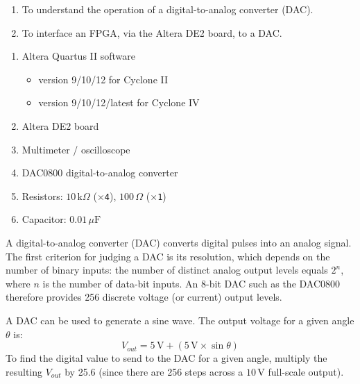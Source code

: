 
\begin{objectives}
  \begin{enumerate}
    \item To understand the operation of a digital-to-analog converter (DAC).
    \item To interface an FPGA, via the Altera DE2 board, to a DAC.
  \end{enumerate}
\end{objectives}

\begin{equipment}
  \begin{enumerate}
    \item Altera Quartus II software
          \begin{itemize}
            \item version 9/10/12 for Cyclone II
            \item version 9/10/12/latest for Cyclone IV
          \end{itemize}
    \item Altera DE2 board
    \item Multimeter / oscilloscope
    \item DAC0800 digital-to-analog converter
    \item Resistors: $10\,\text{k}\Omega$ (\texttt{$\times$4}), $100\,\Omega$ (\texttt{$\times$1})
    \item Capacitor: $0.01\,\mu\text{F}$
  \end{enumerate}
\end{equipment}

\begin{introduction}
  A digital-to-analog converter (DAC) converts digital pulses into an analog signal. The first criterion for judging a DAC is its resolution, which depends on the number of binary inputs: the number of distinct analog output levels equals $2^n$, where $n$ is the number of data-bit inputs. An 8-bit DAC such as the DAC0800 therefore provides 256 discrete voltage (or current) output levels.

  A DAC can be used to generate a sine wave. The output voltage for a given angle $\theta$ is:
  \[
    V_{out} = 5\,\text{V} + \left(5\,\text{V} \times \sin\theta\right)
  \]
  To find the digital value to send to the DAC for a given angle, multiply the resulting $V_{out}$ by 25.6 (since there are 256 steps across a $10\,\text{V}$ full-scale output).
\end{introduction}

